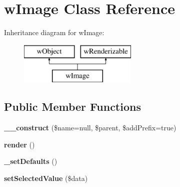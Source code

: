 \hypertarget{classwImage}{
\section{wImage Class Reference}
\label{classwImage}
}
Inheritance diagram for wImage:\begin{figure}[H]
\begin{center}
\leavevmode
\includegraphics[height=2.000000cm]{classwImage}
\end{center}
\end{figure}
\subsection*{Public Member Functions}
\begin{DoxyCompactItemize}
\item 
\hypertarget{classwImage_ad04ab34237d290d5270d432e5c74d60c}{
{\bfseries \_\-\_\-construct} (\$name=null, \$parent, \$addPrefix=true)}
\label{classwImage_ad04ab34237d290d5270d432e5c74d60c}

\item 
\hypertarget{classwImage_a9a7c7b21b64fc355af8b9a09545813a1}{
{\bfseries render} ()}
\label{classwImage_a9a7c7b21b64fc355af8b9a09545813a1}

\item 
\hypertarget{classwImage_a0a9240d24e243ad9e679d05c3a426b70}{
{\bfseries \_\-setDefaults} ()}
\label{classwImage_a0a9240d24e243ad9e679d05c3a426b70}

\item 
\hypertarget{classwImage_adbcf8345c605d938ecbe34b893943987}{
{\bfseries setSelectedValue} (\$data)}
\label{classwImage_adbcf8345c605d938ecbe34b893943987}

\end{DoxyCompactItemize}
